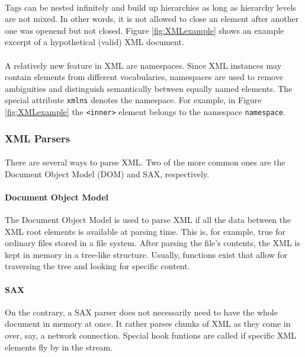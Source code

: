 \paragraph{}
Tags can be nested infinitely and build up hierarchies as long as hierarchy levels are not mixed. In other words, it is not allowed to close an element after another one was openend but not closed. Figure \ref{fig:XMLexample} shows an example excerpt of a hypothetical (valid) XML document.

\paragraph{}
A relatively new feature in XML are namespaces. Since XML instances may contain elements from different vocabularies, namespaces are used to remove ambiguities and distinguish semantically between equally named elements. The special attribute \texttt{xmlns} denotes the namespace. For example, in Figure \ref{fig:XMLexample} the \texttt{<inner>} element belongs to the namespace \texttt{namespace}.

\subsubsection{XML Parsers}
\paragraph{}
There are several ways to parse XML. Two of the more common ones are the Document Object Model (DOM) and SAX, respectively.
\paragraph{Document Object Model}
The Document Object Model is used to parse XML if all the data between the XML root elements is available at parsing time. This is, for example, true for ordinary files stored in a file system. After parsing the file's contents, the XML is kept in memory in a tree-like structure. Usually, functions exist that allow for traversing the tree and looking for specific content.

\paragraph{SAX}
On the contrary, a SAX parser does not necessarily need to have the whole document in memory at once. It rather parses chunks of XML as they come in over, say, a network connection. Special hook funtions are called if specific XML elements fly by in the stream.


